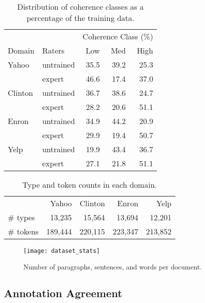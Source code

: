 \documentclass[11pt,a4paper]{article}
\begin{document}
\begin{table}[htb]
\small
\begin{center}
\begin{tabular}{llrrr}
\toprule
 & & \multicolumn{3}{c}{Coherence Class (\%)} \\
Domain & Raters & Low & Med & High \\
\midrule
Yahoo 	& untrained	& 35.5 & 39.2 & 25.3  \\
	 	& expert	& 46.6 & 17.4 & 37.0 \\
Clinton & untrained & 36.7 & 38.6 & 24.7 \\
		& expert & 28.2 & 20.6 & 51.1 \\
Enron 	& untrained & 34.9 & 44.2 & 20.9 \\
		& expert & 29.9 & 19.4 & 50.7 \\
Yelp 	& untrained & 19.9 & 43.4 & 36.7 \\
		& expert & 27.1 & 21.8 & 51.1 \\
\bottomrule
\end{tabular}
\caption{Distribution of coherence classes as a percentage of the training data.}
\label{tab:class_distribution}
\end{center}
\end{table} 

\begin{table}[htb]
\small
\begin{center}
\begin{tabular}{lrrrr}
\toprule
 & Yahoo & Clinton & Enron & Yelp \\
\# types & 13,235 & 15,564 & 13,694 & 12,201 \\
\# tokens & 189,444 & 220,115 & 223,347 & 213,852 \\
\bottomrule
\end{tabular}
\caption{Type and token counts in each domain.}
\label{tab:type_token}
\end{center}
\end{table} 

\begin{figure*}[tb]
    \centering
    \texttt{[image: dataset\_stats]}
\caption{Number of paragraphs, sentences, and words per document.}
    \label{fig:paragraphs}
\end{figure*}


\subsection{Annotation Agreement}
\label{sec:agreement}
\end{document}
